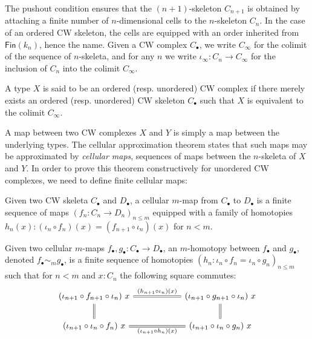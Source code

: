 \documentclass{easychair}
\begin{document}
The pushout condition ensures that the \( (n + 1) \)-skeleton \( C_{n+1} \) is obtained by attaching
a finite number of \( n \)-dimensional cells to the \( n \)-skeleton \( C_n \). In the case of an
ordered CW skeleton, the cells are equipped with an order inherited from \( \mathsf{Fin}(k_n) \),
hence the name.
%
Given a CW complex \( C_{\bullet} \), we write \( C_\infty \) for the colimit of the sequence of
\( n \)-skeleta, and for any \( n \) we write $\iota_\infty : C_n \to C_\infty$ for the inclusion of
$C_n$ into the colimit $C_\infty$.

\begin{definition}[CW complexes]
  A type \( X \) is said to be an ordered (resp. unordered) CW complex if there merely exists an
  ordered (resp. unordered) CW skeleton \( C_{\bullet} \) such that \( X \) is equivalent to the
  colimit \( C_\infty \).
\end{definition}

A map between two CW complexes \( X \) and \( Y \) is simply a map between the underlying types.
%
The cellular approximation theorem states that such maps may be approximated by \emph{cellular maps},
\ie sequences of maps between the \( n \)-skeleta of \( X \) and \( Y \).
%
In order to prove this theorem constructively for unordered CW complexes, we need to define finite
cellular maps:

\begin{definition}
  Given two CW skeleta $C_\bullet$ and $D_\bullet$, a cellular $m$-map from \( C_\bullet \) to \( D_\bullet \)
  is a finite sequence of maps $(f_n : C_n \to D_n)_{n \leq m}$ equipped with a family of homotopies
  $h_n(x) : (\iota_n \circ f_{n})(x) = (f_{n+1} \circ \iota_n)(x)$ for $n < m$.
\end{definition}

\begin{definition}
  Given two cellular $m$-maps $f_\bullet , g_\bullet : C_\bullet \to D_\bullet$, an
  $m$-homotopy between \( f_\bullet \) and \( g_\bullet \), denoted $f_\bullet \sim_m g_\bullet$, is a finite sequence of homotopies\linebreak
  \( (h_n : \iota_n \circ f_n = \iota_n \circ g_n)_{n \leq m} \) such that for \( n < m \) and \( x : C_n \) the following square commutes:
  \[
\begin{tikzcd}[ampersand replacement=\&,column sep = 2cm]
	{(\iota_{n+1} \circ f_{n+1} \circ \iota_n)~x} \& {(\iota_{n+1} \circ g_{n+1} \circ \iota_n)~x} \\
	{(\iota_{n+1} \circ \iota_n \circ f_n)~x} \& {(\iota_{n+1} \circ \iota_n \circ g_n)~x}
	\arrow[double equal sign distance, -, double, "{(h_{n+1} \circ \iota_n)(x)}", from=1-1, to=1-2]
	\arrow[double equal sign distance, -, double, from=1-1, to=2-1]
	\arrow[double equal sign distance, -, double, "{(\iota_{n+1} \circ h_n)(x)}"', from=2-1, to=2-2]
	\arrow[double equal sign distance, -, double, from=1-2, to=2-2]
\end{tikzcd}
\]
\end{definition}
\end{document}
